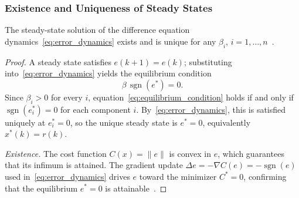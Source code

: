 \subsubsection{\centering Existence and Uniqueness of Steady States}
\begin{theorem}\label{thm:existence_uniqueness}
	The steady-state solution of the difference equation
	dynamics~\eqref{eq:error_dynamics} exists and is unique for any $\beta_i$,
	$i = 1,\ldots,n$~\cite{tymoshchuk2024tracking}.
\end{theorem}

\begin{proof}
	A steady state satisfies $e(k+1) = e(k)$; substituting into~\eqref{eq:error_dynamics}
	yields the equilibrium condition
	\begin{equation}
		\beta\,\operatorname{sgn}(e^{*}) = 0.
		\label{eq:equilibrium_condition}
	\end{equation}
	Since $\beta_i > 0$ for every $i$, equation~\eqref{eq:equilibrium_condition} holds
	if and only if $\operatorname{sgn}(e_i^{*}) = 0$ for each component $i$.
	By~\eqref{eq:error_dynamics}, this is satisfied uniquely at $e_i^{*} = 0$, so the
	unique steady state is $e^{*} = 0$, equivalently $x^{*}(k) = r(k)$.

	\medskip
	\noindent\textit{Existence.}\enspace
	The cost function $C(x) = \|e\|$ is convex in $e$, which guarantees that its
	infimum is attained.  The gradient update $\Delta e = -\nabla C(e) = -\operatorname{sgn}(e)$
	used in~\eqref{eq:error_dynamics} drives $e$ toward the minimizer $C^{*} = 0$,
	confirming that the equilibrium $e^{*} = 0$ is
	attainable~\cite{tymoshchuk2024tracking}.
\end{proof}
